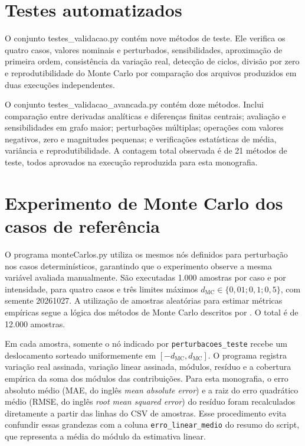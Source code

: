 \documentclass[12pt,openright,oneside,a4paper,brazil]{abntex2}
\newcommand{\arquivo}[1]{\textsf{\small #1}}
\begin{document}
\section{Testes automatizados}
O conjunto \arquivo{testes\_validacao.py} contém nove métodos de teste. Ele verifica os quatro casos, valores nominais e perturbados, sensibilidades, aproximação de primeira ordem, consistência da variação real, detecção de ciclos, divisão por zero e reprodutibilidade do Monte Carlo por comparação dos arquivos produzidos em duas execuções independentes.

O conjunto \arquivo{testes\_validacao\_avancada.py} contém doze métodos. Inclui comparação entre derivadas analíticas e diferenças finitas centrais; avaliação e sensibilidades em grafo maior; perturbações múltiplas; operações com valores negativos, zero e magnitudes pequenas; e verificações estatísticas de média, variância e reprodutibilidade. A contagem total observada é de 21 métodos de teste, todos aprovados na execução reproduzida para esta monografia.

\section{Experimento de Monte Carlo dos casos de referência}
O programa \arquivo{monteCarlos.py} utiliza os mesmos nós definidos para perturbação nos casos determinísticos, garantindo que o experimento observe a mesma variável avaliada manualmente. São executadas 1.000 amostras por caso e por intensidade, para quatro casos e três limites máximos $d_{\mathrm{MC}}\in\{0{,}01;0{,}1;0{,}5\}$, com semente 20261027. A utilização de amostras aleatórias para estimar métricas empíricas segue a lógica dos métodos de Monte Carlo descritos por . O total é de 12.000 amostras.

Em cada amostra, somente o nó indicado por \texttt{perturbacoes\_teste} recebe um deslocamento sorteado uniformemente em $[-d_{\mathrm{MC}},d_{\mathrm{MC}}]$. O programa registra variação real assinada, variação linear assinada, módulos, resíduo e a cobertura empírica da soma dos módulos das contribuições. Para esta monografia, o erro absoluto médio (MAE, do inglês \textit{mean absolute error}) e a raiz do erro quadrático médio (RMSE, do inglês \textit{root mean squared error}) do resíduo foram recalculados diretamente a partir das linhas do CSV de amostras. Esse procedimento evita confundir essas grandezas com a coluna \texttt{erro\_linear\_medio} do resumo do script, que representa a média do módulo da estimativa linear.
\end{document}
